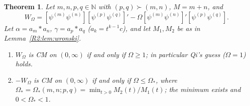 \documentclass[11pt]{amsart}
\newtheorem{theorem}{Theorem}[section]
\theoremstyle{definition}
\theoremstyle{remark}
\begin{document}
\begin{theorem}\label{R2:thm:B}
Let $m,n,p,q\in\mathbb N$ with $(p,q)\succ(m,n)$, $M=m+n$, and
\[
 W_\Omega=[\psi^{(m)}\psi^{(n)}][\psi^{(p)}\psi^{(q)}]'-\Omega[\psi^{(m)}\psi^{(n)}]'[\psi^{(p)}\psi^{(q)}].
\]
Let $\alpha=a_m*a_n$, $\gamma=a_p*a_q$ ($a_k=t^{k-1}c$), and let $M_1,M_2$ be
as in Lemma~\ref{R2:lem:wronski}.
\begin{enumerate}
\item[(i)] $W_\Omega$ is CM on $(0,\infty)$ if and only if $\Omega\ge1$; in
 particular Qi's guess ($\Omega=1$) holds.
\item[(ii)] $-W_\Omega$ is CM on $(0,\infty)$ if and only if
 $\Omega\le\Omega_*$, where $\Omega_*=\Omega_*(m,n;p,q)=\min_{t>0}M_2(t)/M_1(t)$;
 the minimum exists and $0<\Omega_*<1$.
\end{enumerate}
\end{theorem}
\end{document}
